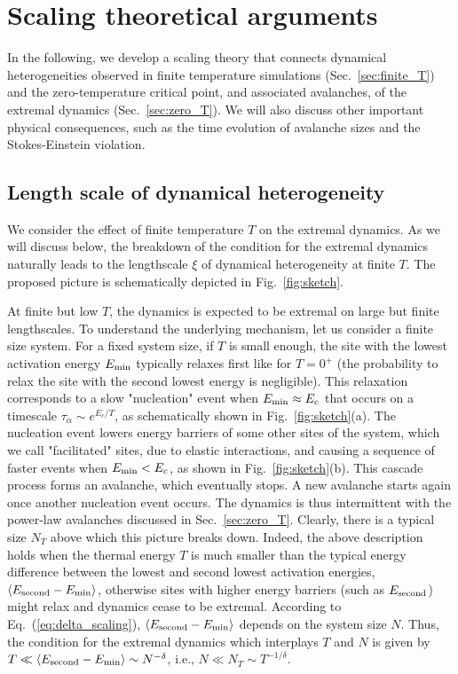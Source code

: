 \documentclass[pre,twocolumn,superscriptaddress,tightenlines,showpacs,longbibliography,floatfix,footinbib]{revtex4-1}
\begin{document}
\section{Scaling theoretical arguments}
\label{sec:scaling_argument}
 

 

In the following, we develop a scaling theory that connects dynamical heterogeneities observed in finite temperature simulations (Sec.~\ref{sec:finite_T}) and the zero-temperature critical point, and associated avalanches, of the extremal dynamics (Sec.~\ref{sec:zero_T}). We will also discuss other important physical consequences, such as the time evolution of avalanche sizes and the  Stokes-Einstein violation.

\subsection{Length scale of dynamical heterogeneity}


We consider the effect of finite temperature $T$ on the extremal dynamics. As we will discuss below, the breakdown of the condition for the extremal dynamics naturally leads to the lengthscale $\xi$ of dynamical heterogeneity at finite $T$. The proposed picture is schematically depicted in Fig.~\ref{fig:sketch}.


At finite but low $T$, the dynamics is expected to be extremal on large but finite lengthscales. To understand the underlying mechanism, let us consider a finite size system. For a fixed system size, if $T$ is small enough, the site with the lowest activation energy $E_{\rm min}$ typically relaxes first like for $T=0^+$ (the probability to relax the site with the second lowest energy is negligible). 
This relaxation corresponds to a slow "nucleation" event when $E_{\rm min} \approx E_c$ that occurs on a timescale $\tau_\alpha \sim e^{E_c/T}$, as schematically shown in Fig.~\ref{fig:sketch}(a). The nucleation event lowers energy barriers of some other sites of the system, which we call "facilitated" sites, due to elastic interactions, and causing a sequence of faster events when $E_{\rm min}<E_c$, as shown in Fig.~\ref{fig:sketch}(b). This cascade process forms an avalanche, which eventually stops. A new avalanche starts again once another nucleation event occurs. The dynamics is thus intermittent with the power-law avalanches discussed in Sec.~\ref{sec:zero_T}. Clearly, there is a typical size $N_T$ above which this picture breaks down.   
Indeed, the above description holds when the thermal energy $T$ is much smaller than the typical energy difference between the lowest and second lowest activation energies, $\langle E_{\rm second} - E_{\rm min} \rangle$, otherwise sites with higher energy barriers (such as $E_{\rm second}$) might relax and dynamics cease to be extremal. 
According to Eq.~(\ref{eq:delta_scaling}), $\langle E_{\rm second} - E_{\rm min} \rangle$ depends on the system size $N$.
Thus, the condition for the extremal dynamics which interplays $T$ and $N$ is given by $T \ll \langle E_{\rm second} - E_{\rm min} \rangle \sim N^{-\delta}$, i.e., $N \ll N_T\sim T^{-1/\delta}$.
\end{document}

